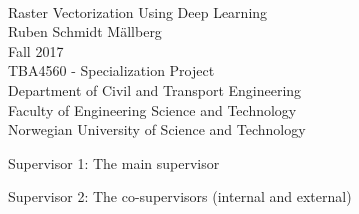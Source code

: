 
\thispagestyle{empty}
\mbox{}\\[6pc]
\begin{center}
\Huge{Raster Vectorization Using Deep Learning}\\[2pc]

\Large{Ruben Schmidt Mällberg}\\[1pc]
\large{Fall 2017}\\[2pc]

TBA4560 - Specialization Project\\
Department of Civil and Transport Engineering \\
Faculty of Engineering Science and Technology\\
Norwegian University of Science and Technology
\end{center}
\vfill

\noindent Supervisor 1: The main supervisor

\noindent Supervisor 2: The co-supervisors (internal and external)

